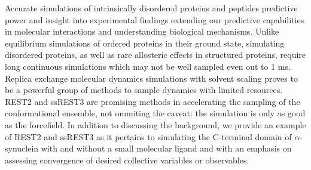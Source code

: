 Accurate simulations of intrinsically disordered proteins and peptides  predictive power and insight into experimental findings extending our predictive capabilities in molecular interactions and understanding biological mechanisms. 
Unlike equilibrium simulations of ordered proteins in their ground state, simulating disordered proteins, as well as rare allosteric effects in structured proteins, require long continuous simulations which may not be well sampled even out to 1 ms. 
Replica exchange molecular dynamics simulations with solvent scaling proves to be a powerful group of methods to sample dynamics with limited resources. 
REST2 and ssREST3 are promising methods in accelerating the sampling of the conformational ensemble, not ommiting the caveat: the simulation is only as good as the forcefield. 
In addition to discussing the background, we provide an example of REST2 and ssREST3 as it pertains to simulating the C-terminal domain of $\alpha$-synuclein with and without a small molecular ligand and with an emphasis on assessing convergence of desired collective variables or observables. 